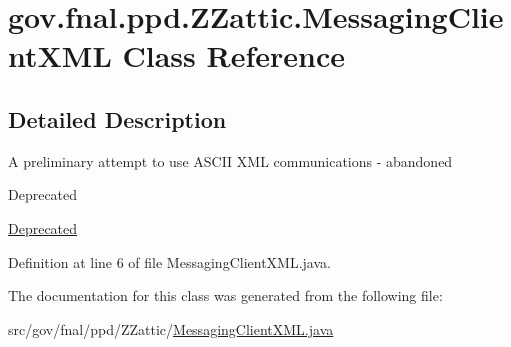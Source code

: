 \hypertarget{classgov_1_1fnal_1_1ppd_1_1ZZattic_1_1MessagingClientXML}{\section{gov.\-fnal.\-ppd.\-Z\-Zattic.\-Messaging\-Client\-X\-M\-L Class Reference}
\label{classgov_1_1fnal_1_1ppd_1_1ZZattic_1_1MessagingClientXML}
}


\subsection{Detailed Description}
A preliminary attempt to use A\-S\-C\-I\-I X\-M\-L communications -\/ abandoned \begin{DoxyRefDesc}{Deprecated}
\item[\hyperlink{deprecated__deprecated000021}{Deprecated}]\end{DoxyRefDesc}


Definition at line 6 of file Messaging\-Client\-X\-M\-L.\-java.



The documentation for this class was generated from the following file\-:\begin{DoxyCompactItemize}
\item 
src/gov/fnal/ppd/\-Z\-Zattic/\hyperlink{MessagingClientXML_8java}{Messaging\-Client\-X\-M\-L.\-java}\end{DoxyCompactItemize}
